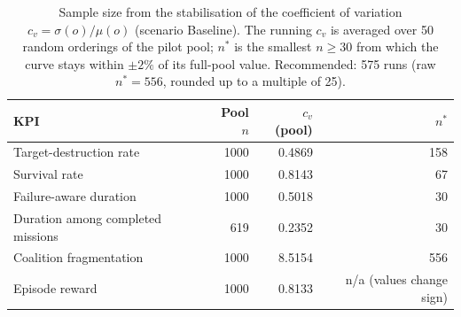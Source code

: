 \begin{table}[htbp]
  \centering
  \caption{Sample size from the stabilisation of the coefficient of variation $c_v=\sigma(o)/\mu(o)$ (scenario Baseline). The running $c_v$ is averaged over 50 random orderings of the pilot pool; $n^*$ is the smallest $n \geq 30$ from which the curve stays within $\pm2\%$ of its full-pool value. Recommended: 575 runs (raw $n^*=556$, rounded up to a multiple of 25).}
  \label{tab:cv_stabilisation_Baseline}
  \begin{tabular}{lrrr}
    \toprule
    KPI & Pool $n$ & $c_v$ (pool) & $n^*$ \\
    \midrule
    Target-destruction rate & 1000 & 0.4869 & 158 \\
    Survival rate & 1000 & 0.8143 & 67 \\
    Failure-aware duration & 1000 & 0.5018 & 30 \\
    Duration among completed missions & 619 & 0.2352 & 30 \\
    Coalition fragmentation & 1000 & 8.5154 & 556 \\
    Episode reward & 1000 & 0.8133 & n/a (values change sign) \\
    \bottomrule
  \end{tabular}
\end{table}
